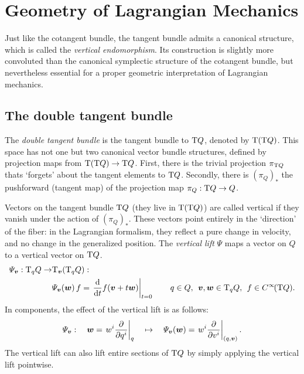 \chapter{Geometry of Lagrangian Mechanics}
\label{app:symplectic_geometry}

Just like the cotangent bundle, the tangent bundle admits a canonical structure, which is called the \emph{vertical endomorphism}. Its construction is slightly more convoluted than the canonical symplectic structure of the cotangent bundle, but nevertheless essential for a proper geometric interpretation of Lagrangian mechanics. 

\section{The double tangent bundle} The \emph{double tangent bundle} is the tangent bundle to \(\mathrm{T}Q\), denoted by \(\mathrm{T}(\mathrm{T}Q)\). This space has not one but two canonical vector bundle structures, defined by projection maps from \(\mathrm{T}(\mathrm{T}Q) \to \mathrm{T}Q\). First, there is the trivial projection \(\pi_{\mathrm{T}Q}\) thats `forgets' about the tangent elements to \(\mathrm{T}Q\). Secondly, there is \( (\pi_{Q})_* \) the pushforward (tangent map) of the projection map \(\pi_Q: \mathrm{T}Q \to Q\). \cite{Abraham1978}
\begin{center}
\end{center}
Vectors on the tangent bundle \(\mathrm{T}Q\) (they live in \(\mathrm{T}(\mathrm{T}Q)\)) are called vertical if they vanish under the action of \( (\pi_Q)_* \). These vectors point entirely in the `direction' of the fiber: in the Lagrangian formalism, they reflect a pure change in velocity, and no change in the generalized position. The \emph{vertical lift} \(\Psi\) maps a vector on \(Q\) to a vertical vector on \(\mathrm{T}Q\). \cite{Carinena1990}
\begin{equation}
    \begin{split}
        \Psi_{\vec{v}}: \tspace{q}{Q} \to & \tspace{\vec{v}}{\qty(\tspace{q}{Q})}: \\ 
        & \Psi_{\vec{v}}(\vec{w})\,f = \left. \dv{}{t} f(\vec{v} + t\vec{w})\right |_{t = 0}
        \qquad q \in Q,\:\: \vec{v},\vec{w}\in \tspace{q}{Q},\:\: f \in \functions{\tbundle{Q}}.
    \end{split}
\end{equation}
In components, the effect of the vertical lift is as follows:
\begin{equation}
     \Psi_{\vec{v}}: \quad \vec{w} = \left. w^i \pdv{}{q^i}\right|_q \quad \mapsto \quad  \Psi_{\vec{v}}(\vec{w}) = \left.w^i \pdv{}{v^i}\right|_{(q, \vec{v})}.
\end{equation}
The vertical lift can also lift entire sections of \(\mathrm{T}Q\) by simply applying the vertical lift pointwise.

